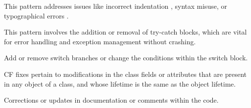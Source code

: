 This pattern addresses issues like incorrect indentation , syntax misuse, or typographical errors .

This pattern involves the addition or removal of try-catch blocks, which are vital for error handling and exception management without crashing.

Add or remove switch branches or change the conditions within the switch block. 

CF fixes pertain to modifications in the class fields or attributes that are present in any object of a class, and whose lifetime is the same as the object lifetime. 

Corrections or updates in documentation or comments within the code. 

